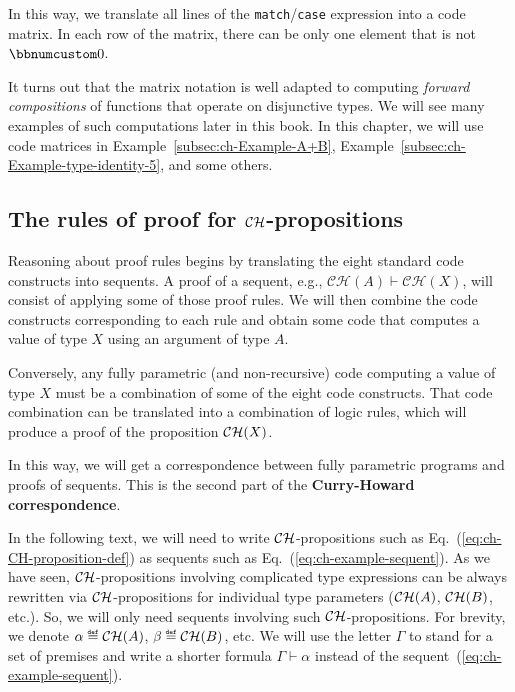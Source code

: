 In this way, we translate all lines of the \lstinline!match!/\lstinline!case!
expression into a code matrix. In each row of the matrix, there can
be only one element that is not $\bbnum 0$.

It turns out that the matrix notation is well adapted to computing\emph{
forward compositions} of functions that operate on disjunctive types.
We will see many examples of such computations later in this book.
In this chapter, we will use code matrices in Example~\ref{subsec:ch-Example-A+B},
Example~\ref{subsec:ch-Example-type-identity-5}, and some others.

\subsection{The rules of proof for ${\cal CH}$-propositions\label{subsec:The-rules-of-proof}}

Reasoning about proof rules begins by translating the eight standard
code constructs into sequents. A proof of a sequent, e.g., $\mathcal{CH}(A)\vdash\mathcal{CH}(X)$,
will consist of applying some of those proof rules. We will then combine
the code constructs corresponding to each rule and obtain some code
that computes a value of type $X$ using an argument of type $A$. 

Conversely, any fully parametric (and non-recursive) code computing
a value of type $X$ must be a combination of some of the eight code
constructs. That code combination
can be translated into a combination of logic rules, which will produce
a proof of the proposition ${\cal CH}(X)$.

In this way, we will get a correspondence between fully parametric
programs and proofs of sequents. This is the second part of the \textbf{Curry-Howard
correspondence}.

In the following text, we will need to write ${\cal CH}$-propositions
such as Eq.~(\ref{eq:ch-CH-proposition-def}) as sequents such as
Eq.~(\ref{eq:ch-example-sequent}). As we have seen, ${\cal CH}$-propositions
involving complicated type expressions can be always rewritten via
${\cal CH}$-propositions for individual type parameters (${\cal CH}(A)$,
${\cal CH}(B)$, etc.). So, we will only need sequents involving such
${\cal CH}$-propositions. For brevity, we denote $\alpha\triangleq{\cal CH}(A)$,
$\beta\triangleq{\cal CH}(B)$, etc. We will use the letter $\Gamma$
to stand for a set of premises and write a shorter formula $\Gamma\vdash\alpha$
instead of the sequent~(\ref{eq:ch-example-sequent}).


